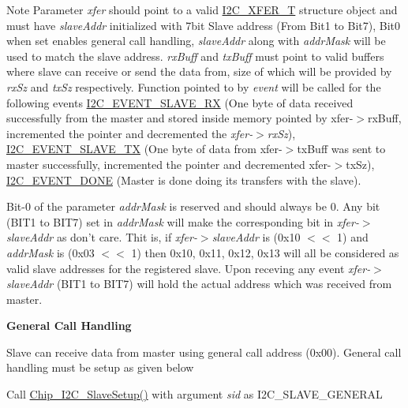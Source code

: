 \begin{DoxyNote}{Note}
Parameter {\itshape xfer} should point to a valid \hyperlink{structI2C__XFER__T}{I2\-C\-\_\-\-X\-F\-E\-R\-\_\-\-T} structure object and must have {\itshape slave\-Addr} initialized with 7bit Slave address (From Bit1 to Bit7), Bit0 when set enables general call handling, {\itshape slave\-Addr} along with {\itshape addr\-Mask} will be used to match the slave address. {\itshape rx\-Buff} and {\itshape tx\-Buff} must point to valid buffers where slave can receive or send the data from, size of which will be provided by {\itshape rx\-Sz} and {\itshape tx\-Sz} respectively. Function pointed to by {\itshape event} will be called for the following events \hyperlink{group__I2C__17XX__40XX_ggacb2cd4e03ea48339d327e4f387441bf3a290fcc1bb657102af26daa1b84472848}{I2\-C\-\_\-\-E\-V\-E\-N\-T\-\_\-\-S\-L\-A\-V\-E\-\_\-\-R\-X} (One byte of data received successfully from the master and stored inside memory pointed by xfer-\/$>$rx\-Buff, incremented the pointer and decremented the {\itshape xfer-\/$>$rx\-Sz}), \hyperlink{group__I2C__17XX__40XX_ggacb2cd4e03ea48339d327e4f387441bf3a3911d9b6505f77f0bed3f21b2710ca58}{I2\-C\-\_\-\-E\-V\-E\-N\-T\-\_\-\-S\-L\-A\-V\-E\-\_\-\-T\-X} (One byte of data from xfer-\/$>$tx\-Buff was sent to master successfully, incremented the pointer and decremented xfer-\/$>$tx\-Sz), \hyperlink{group__I2C__17XX__40XX_ggacb2cd4e03ea48339d327e4f387441bf3a43d00f7d92100d4af6df5514e4ccf1d1}{I2\-C\-\_\-\-E\-V\-E\-N\-T\-\_\-\-D\-O\-N\-E} (Master is done doing its transfers with the slave).\par
 \par
Bit-\/0 of the parameter {\itshape addr\-Mask} is reserved and should always be 0. Any bit (B\-I\-T1 to B\-I\-T7) set in {\itshape addr\-Mask} will make the corresponding bit in {\itshape xfer-\/$>$slave\-Addr} as don't care. Thit is, if {\itshape xfer-\/$>$slave\-Addr} is (0x10 $<$$<$ 1) and {\itshape addr\-Mask} is (0x03 $<$$<$ 1) then 0x10, 0x11, 0x12, 0x13 will all be considered as valid slave addresses for the registered slave. Upon receving any event {\itshape xfer-\/$>$slave\-Addr} (B\-I\-T1 to B\-I\-T7) will hold the actual address which was received from master.\par
 \par
{\bfseries General Call Handling}\par
 Slave can receive data from master using general call address (0x00). General call handling must be setup as given below
\begin{DoxyItemize}
\item Call \hyperlink{group__I2C__17XX__40XX_gaf6ea40668dde26e406f76ff3ddeda527}{Chip\-\_\-\-I2\-C\-\_\-\-Slave\-Setup()} with argument {\itshape sid} as I2\-C\-\_\-\-S\-L\-A\-V\-E\-\_\-\-G\-E\-N\-E\-R\-A\-L

\end{DoxyItemize}
\end{DoxyNote}

